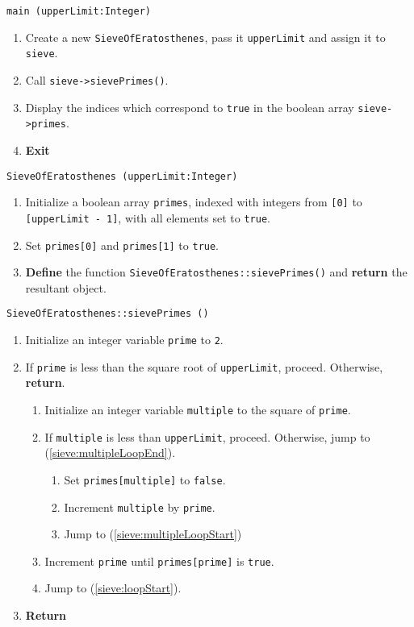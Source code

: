 \algorithm
{\tt main (upperLimit:Integer)}
\begin{enumerate}
	\item	Create a new {\tt SieveOfEratosthenes}, pass it {\tt upperLimit} and assign it to {\tt sieve}.
	\item	Call {\tt sieve->sievePrimes()}.
	\item	Display the indices which correspond to {\tt true} in the boolean array {\tt sieve->primes}.
	\item	{\bf Exit}
\end{enumerate}
\vspace{8mm}
{\tt SieveOfEratosthenes (upperLimit:Integer)}
\begin{enumerate}
	\item	Initialize a boolean array {\tt primes}, indexed with integers from {\tt [0]} to {\tt [upperLimit - 1]},
			with all elements set to {\tt true}.
	\item	Set {\tt primes[0]} and {\tt primes[1]}
			to {\tt true}.
	\item	{\bf Define} the function {\tt SieveOfEratosthenes::sievePrimes()} and {\bf return} the resultant object.
\end{enumerate}
\vspace{5mm}
{\tt SieveOfEratosthenes::sievePrimes ()}
\begin{enumerate}
	\item	Initialize an integer variable {\tt prime} to {\tt 2}.
	\item	If {\tt prime} is less than the square root of {\tt upperLimit}, proceed.
			Otherwise, {\bf return}. \label{sieve:loopStart}
	\begin{enumerate}
		\item	Initialize an integer variable {\tt multiple} to the square of {\tt prime}.
		\item	If {\tt multiple} is less than {\tt upperLimit}, proceed.
				Otherwise, jump to (\ref{sieve:multipleLoopEnd}). \label{sieve:multipleLoopStart}
		\begin{enumerate}
			\item	Set {\tt primes[multiple]} to {\tt false}.
			\item	Increment {\tt multiple} by {\tt prime}.
			\item	Jump to (\ref{sieve:multipleLoopStart})
		\end{enumerate}
		\item	Increment {\tt prime} until {\tt primes[prime]} is {\tt true}. \label{sieve:multipleLoopEnd}
		\item	Jump to (\ref{sieve:loopStart}).
	\end{enumerate}
	\item	{\bf Return}
\end{enumerate}

